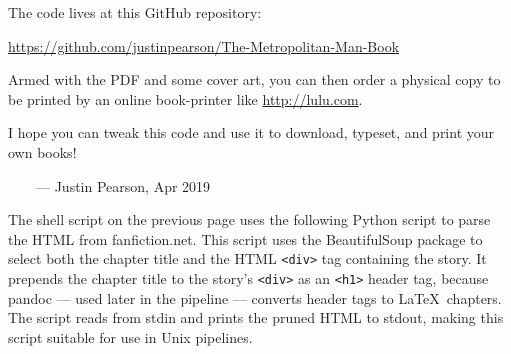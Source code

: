 \documentclass[ebook,12pt]{memoir}
\begin{document}
The code lives at this GitHub repository:

\noindent \url{https://github.com/justinpearson/The-Metropolitan-Man-Book}

Armed with the PDF and some cover art, you can then order a physical copy to be printed by 
an online book-printer like \url{http://lulu.com}.

I hope you can tweak this code and use it to download, typeset, 
and print your own books!

\ \ \ \ --- Justin Pearson, Apr 2019

\normalsize
\cleartoverso


\thispagestyle{empty}



\tiny



\normalsize
\clearpage


\thispagestyle{empty}

\footnotesize
\noindent The shell script on the previous page uses the following Python script 
to parse the HTML from fanfiction.net. This script uses the BeautifulSoup package to
select both the chapter title and the HTML \texttt{<div>} tag containing
the story. It prepends the chapter title to the story's \texttt{<div>}
as an \texttt{<h1>} header tag, because pandoc --- used later in the pipeline --- 
converts header tags to \LaTeX\ chapters. 
The script reads from stdin and prints the pruned HTML to stdout, making this script suitable 
for use in Unix pipelines. 

\vspace{.5cm}

\tiny



\normalsize
\cleartorecto


\tableofcontents*  %
\end{document}
